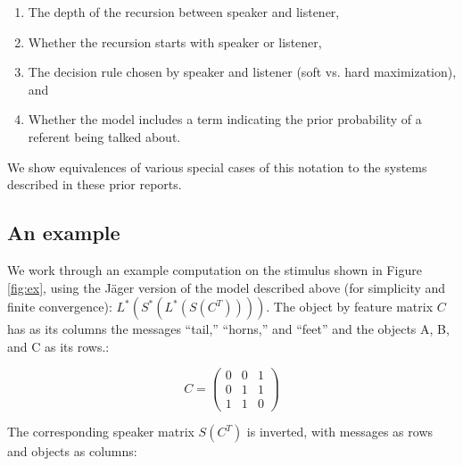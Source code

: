 \begin{enumerate}
\item The depth of the recursion between speaker and listener,
\item Whether the recursion starts with speaker or listener,
\item The decision rule chosen by speaker and listener (soft vs. hard maximization), and 
\item Whether the model includes a term indicating the prior probability of a referent being talked about.
\end{enumerate}

\noindent We show equivalences of various special cases of this notation to the systems described in these prior reports.

\subsection{An example}


We work through an example computation on the stimulus shown in Figure \ref{fig:ex}, using the J\"ager \cite{jaegerinpress} version of the model described above (for simplicity and finite convergence): $L^*(S^*(L^*(S(C^T))))$. The object by feature matrix $C$ has as its columns the messages ``tail,'' ``horns,'' and ``feet'' and the objects A, B, and C as its rows.:

\begin{equation}
C= \left(
    \begin{array}{ccc}
      0 & 0 & 1 \\
      0 & 1 & 1\\
      1 & 1 & 0 
    \end{array} 
  \right)
\end{equation}

The corresponding speaker matrix $S(C^T)$ is inverted, with messages as rows and objects as columns: 

